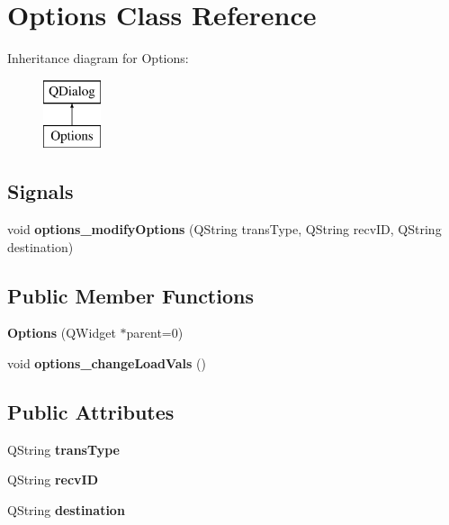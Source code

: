 \hypertarget{class_options}{}\section{Options Class Reference}
\label{class_options}
Inheritance diagram for Options\+:\begin{figure}[H]
\begin{center}
\leavevmode
\includegraphics[height=2.000000cm]{class_options}
\end{center}
\end{figure}
\subsection*{Signals}
\begin{DoxyCompactItemize}
\item 
void {\bfseries options\+\_\+modify\+Options} (Q\+String trans\+Type, Q\+String recv\+ID, Q\+String destination)\hypertarget{class_options_a0a4867eb6d4e87ef4281eac680be2820}{}\label{class_options_a0a4867eb6d4e87ef4281eac680be2820}

\end{DoxyCompactItemize}
\subsection*{Public Member Functions}
\begin{DoxyCompactItemize}
\item 
{\bfseries Options} (Q\+Widget $\ast$parent=0)\hypertarget{class_options_a87403ad1d6bd9ae2b54af860bb0f0952}{}\label{class_options_a87403ad1d6bd9ae2b54af860bb0f0952}

\item 
void {\bfseries options\+\_\+change\+Load\+Vals} ()\hypertarget{class_options_afc062573717b1f2598add732d48540e0}{}\label{class_options_afc062573717b1f2598add732d48540e0}

\end{DoxyCompactItemize}
\subsection*{Public Attributes}
\begin{DoxyCompactItemize}
\item 
Q\+String {\bfseries trans\+Type}\hypertarget{class_options_a6f359e34cb5efdf3e24dd0d86fb576f7}{}\label{class_options_a6f359e34cb5efdf3e24dd0d86fb576f7}

\item 
Q\+String {\bfseries recv\+ID}\hypertarget{class_options_ac3bb77e29ee6b4910bc2406c66963919}{}\label{class_options_ac3bb77e29ee6b4910bc2406c66963919}

\item 
Q\+String {\bfseries destination}\hypertarget{class_options_a882d6e77af04ab32704e0add17079268}{}\label{class_options_a882d6e77af04ab32704e0add17079268}

\end{DoxyCompactItemize}


